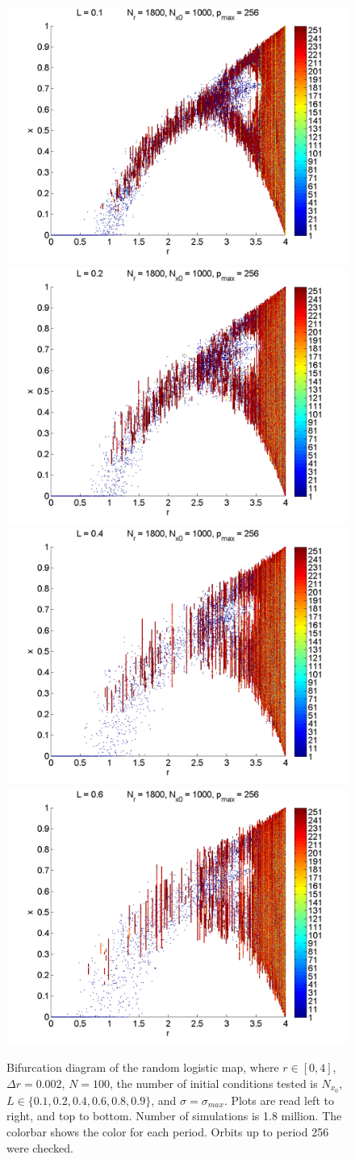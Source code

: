 \begin{figure}[H]\linespread{1}
\caption[Bifurcation diagram of the random logistic map, $\sigma=\sigma_{max}$]{Bifurcation diagram of the random
logistic map, where $r \in [0,4]$, $\Delta r = 0.002$, $N=100$, the
number of initial conditions tested is $N_{x_0}$, $L\in
\{0.1,0.2,0.4,0.6,0.8,0.9\}$, and $\sigma=\sigma_{max}$. Plots are read left to right, and top to
bottom. Number of simulations is 1.8 million. The colorbar shows the color for each period. Orbits up to period 256 were checked.}\label{fig:rlogbif}
	\begin{center}
		\includegraphics[width=.5\textwidth]{figs/rlog_bif_L_01.png}\hfill
		\includegraphics[width=.5\textwidth]{figs/rlog_bif_L_02.png}\\
		\includegraphics[width=.5\textwidth]{figs/rlog_bif_L_04.png}\hfill
		\includegraphics[width=.5\textwidth]{figs/rlog_bif_L_06.png}\\

\end{center}
\end{figure}
